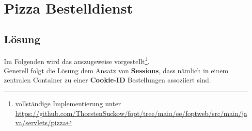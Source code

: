 \section{Pizza Bestelldienst}\label{ch:pizzaservlet}


\subsection{Lösung}

Im Folgenden wird das  auszugsweise vorgestellt\footnote{
vollständige Implementierung unter \url{https://github.com/ThorstenSuckow/fopt/tree/main/ee/foptweb/src/main/java/servlets/pizza}
}.\\
Generell folgt die Lösung dem Ansatz von \textbf{Sessions}, dass nämlich in einem zentralen Container zu einer \textbf{Cookie-ID} Bestellungen
assoziiert sind.

